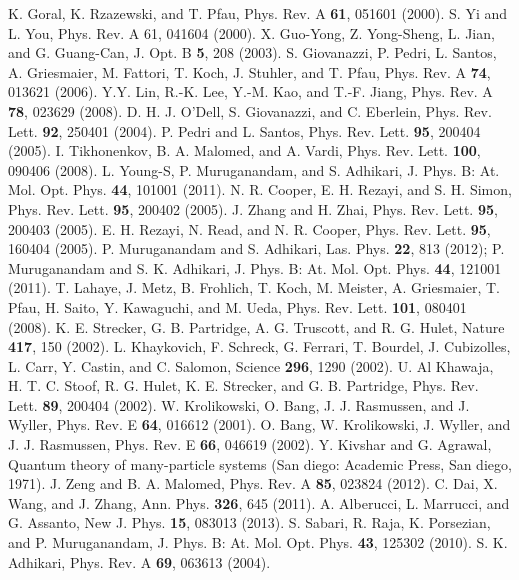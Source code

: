 \documentclass[amsmath,amssymb,article,twocolumn,superscriptaddress,showpacs,10pt]{revtex4-1}
\begin{document}
\begin{thebibliography}{99}
 K. Goral, K. Rzazewski, and T. Pfau, Phys. Rev. A \textbf{61}, 051601 (2000).
 S. Yi and L. You, Phys. Rev. A 61, 041604 (2000).
 X. Guo-Yong, Z. Yong-Sheng, L. Jian, and G. Guang-Can, J. Opt. B \textbf{5}, 208 (2003).
 S. Giovanazzi, P. Pedri, L. Santos, A. Griesmaier, M. Fattori, T. Koch, J. Stuhler, and T. Pfau, Phys. Rev. A \textbf{74}, 013621 (2006).
 Y.Y. Lin, R.-K. Lee, Y.-M. Kao, and T.-F. Jiang, Phys. Rev. A \textbf{78}, 023629 (2008).
 D. H. J. O’Dell, S. Giovanazzi, and C. Eberlein, Phys. Rev. Lett. \textbf{92}, 250401 (2004).
 P. Pedri and L. Santos, Phys. Rev. Lett. \textbf{95}, 200404 (2005).
 I. Tikhonenkov, B. A. Malomed, and A. Vardi, Phys. Rev. Lett. \textbf{100}, 090406 (2008).
 L. Young-S, P. Muruganandam, and S. Adhikari, J. Phys. B: At. Mol. Opt. Phys. \textbf{44}, 101001 (2011).
 N. R. Cooper, E. H. Rezayi, and S. H. Simon, Phys. Rev. Lett. \textbf{95}, 200402 (2005).
 J. Zhang and H. Zhai, Phys. Rev. Lett. \textbf{95}, 200403 (2005).
 E. H. Rezayi, N. Read, and N. R. Cooper, Phys. Rev. Lett. \textbf{95}, 160404 (2005).
 P. Muruganandam and S. Adhikari, Las. Phys. \textbf{22}, 813 (2012); 
 P. Muruganandam and S. K. Adhikari, J.  Phys. B: At. Mol. Opt. Phys. \textbf{44}, 121001 (2011).
 T. Lahaye, J. Metz, B. Frohlich, T. Koch, M. Meister, A. Griesmaier, T. Pfau, H. Saito, Y. Kawaguchi, and M. Ueda, Phys. Rev. Lett. \textbf{101}, 080401 (2008).
 K. E. Strecker, G. B. Partridge, A. G. Truscott, and R. G. Hulet, Nature \textbf{417}, 150 (2002).
 L. Khaykovich, F. Schreck, G. Ferrari, T. Bourdel, J. Cubizolles, L. Carr, Y. Castin, and C. Salomon, Science \textbf{296}, 1290 (2002).
 U. Al Khawaja, H. T. C. Stoof, R. G. Hulet, K. E. Strecker, and G. B. Partridge, Phys. Rev. Lett. \textbf{89}, 200404 (2002).
 W. Krolikowski, O. Bang, J. J. Rasmussen, and J. Wyller, Phys. Rev. E \textbf{64}, 016612 (2001).
 O. Bang, W. Krolikowski, J. Wyller, and J. J. Rasmussen, Phys. Rev. E \textbf{66}, 046619 (2002).
 Y. Kivshar and G. Agrawal, Quantum theory of many-particle systems (San diego: Academic Press, San diego, 1971).
 J. Zeng and B. A. Malomed, Phys. Rev. A \textbf{85}, 023824 (2012).
 C. Dai, X. Wang, and J. Zhang, Ann. Phys. \textbf{326}, 645 (2011).
 A. Alberucci, L. Marrucci, and G. Assanto, New J. Phys. \textbf{15}, 083013 (2013).
 S. Sabari, R. Raja, K. Porsezian, and P. Muruganandam, J. Phys. B: At. Mol. Opt. Phys. \textbf{43}, 125302 (2010).
 S. K. Adhikari, Phys. Rev. A \textbf{69}, 063613 (2004).


\end{thebibliography}
\end{document}
